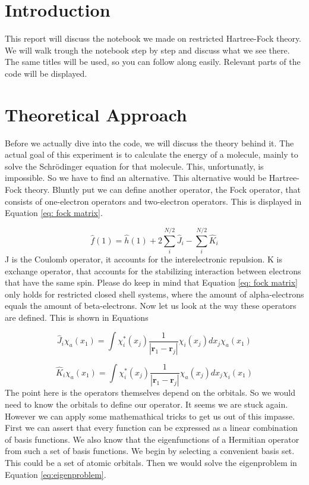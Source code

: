 \section{Introduction}
\label{sec:intro}
This report will discuss the notebook we made on restricted Hartree-Fock theory.
 We will walk trough the notebook step by step and discuss what we see there. 
 The same titles will be used, so you can follow along easily. 
 Relevant parts of the code will be displayed.

 \section{Theoretical Approach}
 \label{sec:theory}
 Before we actually dive into the code, we will discuss the theory behind it.
 The actual goal of this experiment is to calculate the energy of a molecule,
 mainly to solve the Schrödinger equation for that molecule. This, unfortunatly,
 is impossible. So we have to find an alternative. This alternative would be
Hartree-Fock theory. Bluntly put we can define another operator, the Fock operator,
that consists of one-electron operators and two-electron operators. This is 
displayed in Equation \ref{eq: fock matrix}. 

\begin{equation}\label{eq: fock matrix}
    \hat{f}(1) = \hat{h}(1) + 2\sum_i^{N/2}\hat{J}_i - \sum_i^{N/2}\hat{K}_i
\end{equation}
 J is the Coulomb operator, it accounts for the interelectronic repulsion. K is 
 exchange operator, that accounts for the stabilizing interaction between 
 electrons that have the same spin. Please do keep in mind that Equation
 \ref{eq: fock matrix} only holds for restricted closed shell systems, where the
 amount of alpha-electrons equals the amount of beta-electrons. Now let us look
 at the way these operators are defined. This is shown in Equations

 \begin{equation}\label{eq:coulomb}
    \hat{J}_i\chi_a(x_1) = \int\chi_i^*(x_j)\frac{1}{|\boldsymbol{r}_1 - \boldsymbol{r}_j|}\chi_i(x_j)dx_j\chi_a(x_1)
 \end{equation}

 \begin{equation}\label{eq:exchange}
     \hat{K}_i\chi_a(x_1) = \int\chi_i^*(x_j)\frac{1}{|\boldsymbol{r}_1 - \boldsymbol{r}_j|}\chi_a(x_j)dx_j\chi_i(x_1)
 \end{equation}
The point here is the operators themselves depend on the orbitals. So we would
need to know the orbitals to define our operator. It seems we are stuck again.
However we can apply some mathemathical tricks to get us out of this impasse. 
First we can assert that every function can be expressed as a linear combination
of basis functions. We also know that the eigenfunctions of a Hermitian operator
from such a set of basis functions. We begin by selecting a convenient basis set.
This could be a set of atomic orbitals. Then we would solve the eigenproblem in
Equation \ref{eq:eigenproblem}.

